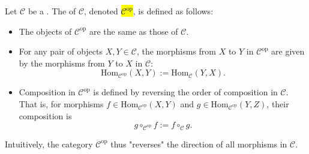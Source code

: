 \begin{definition} \label{definition:opposite_category_of_a_category}

    Let $\mathcal{C}$ be a . The  of $\mathcal{C}$, denoted \hl{$\mathcal{C}^{\mathrm{op}}$}, is defined as follows:
    \begin{itemize}
        \item The objects of $\mathcal{C}^{\mathrm{op}}$ are the same as those of $\mathcal{C}$.
        \item For any pair of objects $X,Y \in \mathcal{C}$, the morphisms from $X$ to $Y$ in $\mathcal{C}^{\mathrm{op}}$ are given by the morphisms from $Y$ to $X$ in $\mathcal{C}$:
        \[
        \mathrm{Hom}_{\mathcal{C}^{\mathrm{op}}}(X,Y) := \mathrm{Hom}_{\mathcal{C}}(Y,X).
        \]
        \item Composition in $\mathcal{C}^{\mathrm{op}}$ is defined by reversing the order of composition in $\mathcal{C}$. That is, for morphisms $f \in \mathrm{Hom}_{\mathcal{C}^{\mathrm{op}}}(X,Y)$ and $g \in \mathrm{Hom}_{\mathcal{C}^{\mathrm{op}}}(Y,Z)$, their composition is
        \[
        g \circ_{\mathcal{C}^{\mathrm{op}}} f := f \circ_{\mathcal{C}} g.
        \]
    \end{itemize}
    Intuitively, the category $\mathcal{C}^{\mathrm{op}}$ thus "reverses" the direction of all morphisms in $\mathcal{C}$.

\end{definition}
